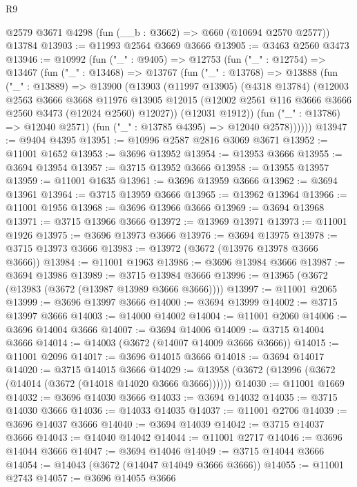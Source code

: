 \begin{lexlean}{R9}
\begin{coremodule}
    @2579
    @3671
    @4298
    (fun (__b : @3662) => @660 (@10694 @2570 @2577))
    @13784
@13903 := @11993 @2564 @3669 @3666
@13905 := @3463 @2560 @3473
@13946 := @10992
    (fun ("_" : @9405) =>
    @12753
      (fun ("_" : @12754) =>
      @13467
        (fun ("_" : @13468) =>
        @13767
          (fun ("_" : @13768) =>
          @13888
            (fun ("_" : @13889) =>
            @13900
              (@13903
                (@11997 @13905)
                (@4318 @13784)
                (@12003
                  @2563
                  @3666
                  @3668
                  @11976
                  @13905
                  @12015
                  (@12002 @2561 @116 @3666 @3666 @2560 @3473 (@12024 @2560) @12027))
                (@12031 @1912))
              (fun ("_" : @13786) => @12040 @2571)
              (fun ("_" : @13785 @4395) => @12040 @2578))))))
@13947 := @9404 @4395
@13951 := @10996 @2587 @2816 @3069 @3671
@13952 := @11001 @1652
@13953 := @3696 @13952
@13954 := @13953 @3666
@13955 := @3694 @13954
@13957 := @3715 @13952 @3666
@13958 := @13955 @13957
@13959 := @11001 @1635
@13961 := @3696 @13959 @3666
@13962 := @3694 @13961
@13964 := @3715 @13959 @3666
@13965 := @13962 @13964
@13966 := @11001 @1956
@13968 := @3696 @13966 @3666
@13969 := @3694 @13968
@13971 := @3715 @13966 @3666
@13972 := @13969 @13971
@13973 := @11001 @1926
@13975 := @3696 @13973 @3666
@13976 := @3694 @13975
@13978 := @3715 @13973 @3666
@13983 := @13972 (@3672 (@13976 @13978 @3666 @3666))
@13984 := @11001 @1963
@13986 := @3696 @13984 @3666
@13987 := @3694 @13986
@13989 := @3715 @13984 @3666
@13996 := @13965 (@3672 (@13983 (@3672 (@13987 @13989 @3666 @3666))))
@13997 := @11001 @2065
@13999 := @3696 @13997 @3666
@14000 := @3694 @13999
@14002 := @3715 @13997 @3666
@14003 := @14000 @14002
@14004 := @11001 @2060
@14006 := @3696 @14004 @3666
@14007 := @3694 @14006
@14009 := @3715 @14004 @3666
@14014 := @14003 (@3672 (@14007 @14009 @3666 @3666))
@14015 := @11001 @2096
@14017 := @3696 @14015 @3666
@14018 := @3694 @14017
@14020 := @3715 @14015 @3666
@14029 := @13958 (@3672 (@13996 (@3672 (@14014 (@3672 (@14018 @14020 @3666 @3666))))))
@14030 := @11001 @1669
@14032 := @3696 @14030 @3666
@14033 := @3694 @14032
@14035 := @3715 @14030 @3666
@14036 := @14033 @14035
@14037 := @11001 @2706
@14039 := @3696 @14037 @3666
@14040 := @3694 @14039
@14042 := @3715 @14037 @3666
@14043 := @14040 @14042
@14044 := @11001 @2717
@14046 := @3696 @14044 @3666
@14047 := @3694 @14046
@14049 := @3715 @14044 @3666
@14054 := @14043 (@3672 (@14047 @14049 @3666 @3666))
@14055 := @11001 @2743
@14057 := @3696 @14055 @3666

\end{coremodule}
\end{lexlean}
